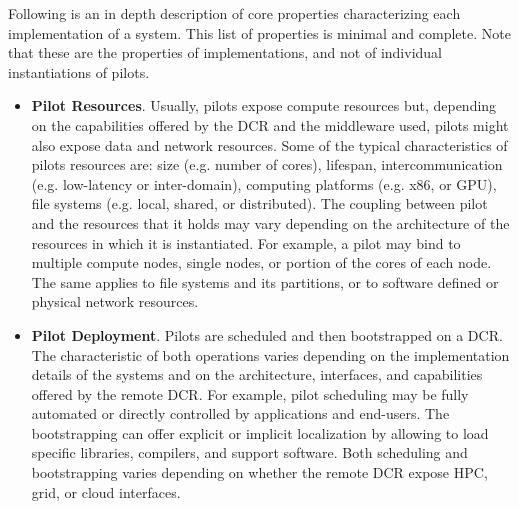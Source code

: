\documentclass{sig-alternate}
\begin{document}
Following is an in depth description of core properties characterizing each
implementation of a \pilot system. This list of properties is minimal and
complete. Note that these are the properties of \pilot implementations, and not
of individual instantiations of pilots.

\begin{itemize}

\item \textbf{Pilot Resources}. Usually, pilots expose compute resources but,
  depending on the capabilities offered by the DCR and the middleware used,
  pilots might also expose data and network resources. Some of the typical
  characteristics of pilots resources are: size (e.g. number of cores),
  lifespan, intercommunication (e.g. low-latency or inter-domain), computing
  platforms (e.g. x86, or GPU), file systems (e.g. local, shared, or
  distributed). The coupling between pilot and the resources that it holds may
  vary depending on the architecture of the resources in which it is
  instantiated. For example, a pilot may bind to multiple compute nodes, single
  nodes, or portion of the cores of each node. The same applies to file systems
  and its partitions, or to software defined or physical network resources.

   

\item \textbf{Pilot Deployment}. Pilots are scheduled and then bootstrapped on
  a DCR. The characteristic of both operations varies depending on the
  implementation details of the \pilot systems and on the architecture,
  interfaces, and capabilities offered by the remote DCR. For example, pilot
  scheduling may be fully automated or directly controlled by applications and
  end-users. The bootstrapping can offer explicit or implicit localization by
  allowing to load specific libraries, compilers, and support software. Both
  scheduling and bootstrapping varies depending on whether the remote DCR expose
  HPC, grid, or cloud interfaces.  


\end{itemize}
\end{document}
